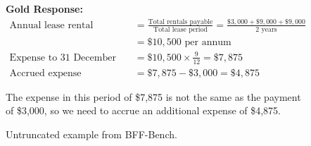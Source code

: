 \begin{figure}[ht!]
\begin{tcolorbox}[
    boxsep=1pt,
    left=2pt,right=2pt,top=2pt,bottom=2pt,
    colback=green!2!white,
    colframe=green!25!black,
    before skip=1pt,
    after skip=2pt,
    sharp corners=downhill,
]
\small
\textbf{Gold Response:}
\[
\begin{aligned}
\text{Annual lease rental expense} &= \frac{\text{Total rentals payable}}{\text{Total lease period}} = \frac{\$3,000 + \$9,000 + \$9,000}{2\text{ years}} \\[6pt]
&= \$10,500\text{ per annum} \\[8pt]
\text{Expense to 31 December 2023} &= \$10,500 \times \frac{9}{12} = \$7,875 \\[8pt]
\text{Accrued expense} &= \$7,875 - \$3,000 = \$4,875
\end{aligned}
\]

The expense in this period of \$7,875 is not the same as the payment of \$3,000, so we need to accrue an additional expense of \$4,875.
\end{tcolorbox}


\caption{Untruncated example from BFF-Bench.}
\label{fig:bffbench-sample-full}
\end{figure}
